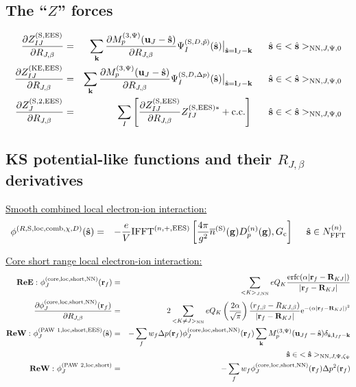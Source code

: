 \documentclass[paper=a4, fontsize=11pt]{article} %
\numberwithin{equation}{section} %
\numberwithin{figure}{section} %
\numberwithin{table}{section} %
\newcommand{\p}{\partial}
\newcommand{\ol}{\overline}
\newcommand{\bu}{{\bf{u}}}
\newcommand{\bl}{{\bf{l}}}
\newcommand{\bk}{{\bf{k}}}
\newcommand{\bs}{{\bf{s}}}
\newcommand{\bg}{{\bf{g}}}
\newcommand{\br}{{\bf{r}}}
\newcommand{\bR}{{\bf{R}}}
\newcommand{\hs}{{\hat{\bf{s}}}}
\newcommand{\rS}{{\mathrm{S}}}
\newcommand{\rKE}{{\mathrm{KE}}}
\newcommand{\rEES}{{\mathrm{EES}}}
\newcommand{\rcore}{{\mathrm{core}}}
\newcommand{\rNN}{{\mathrm{NN}}}
\newcommand{\re}{{\mathrm{e}}}
\newcommand{\rshort}{{\mathrm{short}}}
\newcommand{\rcc}{{\mathrm{c.c.}}}
\newcommand{\rerfc}{{\mathrm{erfc}}}
\newcommand{\rP}{{\mathrm{PAW}}}
\newcommand{\rcomb}{{\mathrm{comb}}}
\newcommand{\rlo}{{\mathrm{loc}}}
\newcommand{\al}{{\alpha}}
\newcommand{\RJb}{{R_{J,\beta}}}
\newcommand{\NFFTn}{{N^{(n)}_{\mathrm{FFT}}}}
\newcommand{\Gc}{{G_{\mathrm{c}}}}
\newcommand{\Dng}{{D^{(n)}_p(\bg)}}
\newcommand{\Mp}{{M_p^{(3,\Psi)}}}
\newcommand{\IFFTnEES}{{\mathrm{IFFT}^{(n,+,\rEES)}}}
\newcommand{\hsJp}{{<\hs>_{\rNN,J,\Psi,\zeta_\Psi}}}
\newcommand{\hsJpzr}{{<\hs>_{\rNN,J,\Psi,0}}}
\newcommand{\hsinJp}{{\ \ \ \ \ \hs  \in  \hsJp}}
\newcommand{\hsinJpzr}{{\ \ \ \ \ \hs  \in  \hsJpzr}}
\newcommand{\hsinn}{{\ \ \ \ \hs \in \NFFTn}}
\newcommand{\ReE}{{{\bf ReE:\ }}}
\newcommand{\ReW}{{{\bf ReW:\ }}}
\begin{document}
\subsection{The ``$Z$'' forces}\label{Zforces}
\begin{eqnarray}
\label{gr:dZSdR}
\frac{\p Z_{IJ}^{(\rS,\rEES)}}{\p \RJb}
&=& \sum_{\bk} \frac{\p \Mp(\bu_{J}-\hat \bs)}{\p \RJb}\Psi_I^{(\rS,D,\tilde p)}(\hs)\big|_{\hat \bs=\bl_J-\bk} \hsinJpzr \\
\label{gr:dZKEdR}
\frac{\p Z_{IJ}^{(\rKE,\rEES)}}{\p \RJb}
&=& \sum_{\bk} \frac{\p \Mp(\bu_{J}-\hat \bs)}{\p \RJb}\Psi_I^{(\rS,D,\Delta p)}(\hs)\big|_{\hat \bs=\bl_J-\bk} \hsinJpzr \\
\label{gr:dZS2dR}
\frac{\p Z_{J}^{(\rS,2,\rEES)}}{\p \RJb} 
&=& \sum_I \left[\frac{\p Z_{IJ}^{(\rS,\rEES)}}{\p \RJb}Z_{IJ}^{(\rS,\rEES)*}+\rcc\right] \hsinJpzr 
\end{eqnarray}


\subsection{KS potential-like functions and their $\RJb$ derivatives}



\underline{Smooth combined local electron-ion interaction:}
\begin{eqnarray}
\label{phi:sRSloc}
\phi^{(R,\rS,\rlo,\rcomb,\chi,D)}(\hs)
&=& -\frac{e}{V} \IFFTnEES \left[\frac{4\pi}{g^2} \ol{n}^{(\rS)}(\bg) \Dng, \Gc \right] \hsinn
\end{eqnarray}

\underline{Core short range local electron-ion interaction:}
\begin{eqnarray}
\label{ReEphi:rfcorelocshortNN}
\ReE \phi_J^{(\rcore,\rlo,\rshort,\rNN)}(\br_f) &=& \sum_{<K>_{J,\rNN}}eQ_K\frac{\rerfc(\alpha|\br_f-\bR_{KJ}|)}{|\br_f-\bR_{KJ}|}\\
\label{dphidR:flocshortNN}
\frac{\p \phi_J^{(\rcore,\rlo,\rshort,\rNN)}(\br_f)}{\p \RJb}
&=& 2\sum_{<K\neq J>_{\rNN}}eQ_K \left(\frac{2\al}{\sqrt{\pi}} \right)\frac{\left(r_{f,\beta}-R_{KJ,\beta}\right)}{|\br_f-\bR_{KJ}|}\re^{-(\alpha|\br_f-\bR_{KJ}|)^2}\\
\label{ReWphi:phiSloc}
\ReW \phi_J^{(\rP\ 1,\rlo,\rshort,\rEES)}(\hs) &=& -\sum_f w_f \Delta p(\br_f) \phi_J^{(\rcore,\rlo,\rshort,\rNN)}(\br_f)  \sum_{\bk} \Mp(\bu_{Jf}-\hat \bs)\delta_{\hat \bs,\bl_{Jf}-\bk}\nonumber\\
&\ & \hspace*{2.5in}\hsinJp \\
\label{ReWphi:PAW2locshort}
\ReW \phi_J^{(\rP\ 2,\rlo,\rshort)} 
&=& - \sum_f w_f \phi_J^{(\rcore,\rlo,\rshort,\rNN)}(\br_f)\Delta p^2(\br_f) 
\end{eqnarray}
\end{document}
